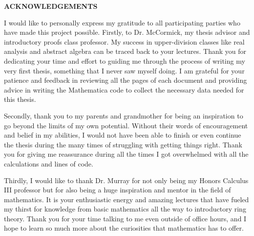 


\begin{center}

\end{center}
\begin{center}

{\bf\fontsize{14pt}{14.5pt}\selectfont \uppercase{Acknowledgements}}\\\vspace{1cm}
\end{center}






I would like to personally express my gratitude to all participating parties who have made this project possible. Firstly, to Dr. McCormick, my thesis advisor and introductory proofs class professor. My success in upper-division classes like real analysis and abstract algebra can be traced back to your lectures. Thank you for dedicating your time and effort to guiding me through the process of writing my very first thesis, something that I never saw myself doing. I am grateful for your patience and feedback in reviewing all the pages of each document and providing advice in writing the Mathematica code to collect the necessary data needed for this thesis.

Secondly, thank you to my parents and grandmother for being an inspiration to go beyond the limits of my own potential. Without their words of encouragement and belief in my abilities, I would not have been able to finish or even continue the thesis during the many times of struggling with getting things right. Thank you for giving me reassurance during all the times I got overwhelmed with all the calculations and lines of code.

Thirdly, I would like to thank Dr. Murray for not only being my Honors Calculus III professor but for also being a huge inspiration and mentor in the field of mathematics. It is your enthusiastic energy and amazing lectures that have fueled my thirst for knowledge from basic mathematics all the way to introductory ring theory. Thank you for your time talking to me even outside of office hours, and I hope to learn so much more about the curiosities that mathematics has to offer.

